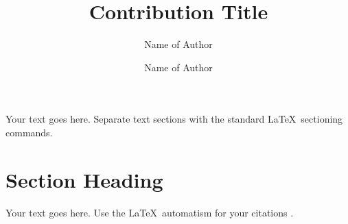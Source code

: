 %
%
%
%









%

\title*{Contribution Title}
\author{Name of Author\and
Name of Author}
%
%
\maketitle

Your text goes here. Separate text sections with the standard \LaTeX\
sectioning commands.

\section{Section Heading}
\label{sec:1b}
Your text goes here. Use the \LaTeX\ automatism for your citations
\cite{monograph}.

